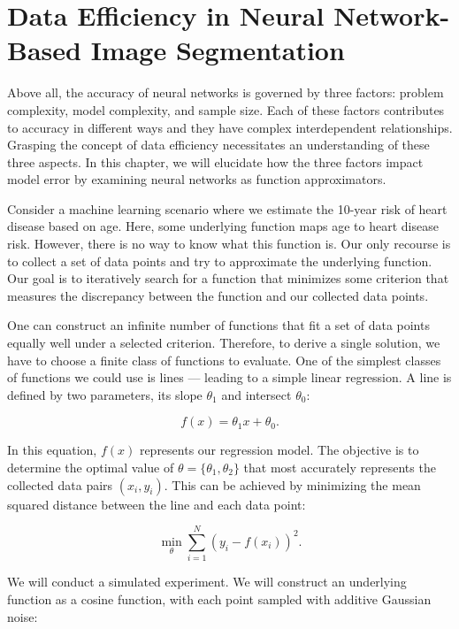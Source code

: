 
\chapter{Data Efficiency in Neural Network-Based Image Segmentation}
\label{chap:data-efficiency}

Above all, the accuracy of neural networks is governed by three factors: problem complexity, model complexity, and sample size. Each of these factors contributes to accuracy in different ways and they have complex interdependent relationships. Grasping the concept of data efficiency necessitates an understanding of these three aspects. In this chapter, we will elucidate how the three factors impact model error by examining neural networks as function approximators.

Consider a machine learning scenario where we estimate the 10-year risk of heart disease based on age. Here, some underlying function maps age to heart disease risk. However, there is no way to know what this function is. Our only recourse is to collect a set of data points and try to approximate the underlying function. Our goal is to iteratively search for a function that minimizes some criterion that measures the discrepancy between the function and our collected data points.

One can construct an infinite number of functions that fit a set of data points equally well under a selected criterion. Therefore, to derive a single solution, we have to choose a finite class of functions to evaluate. One of the simplest classes of functions we could use is lines --- leading to a simple linear regression. A line is defined by two parameters, its slope $\theta_1$ and intersect $\theta_0$:

\begin{equation}
	f(x) = \theta_1 x + \theta_0.
\end{equation}

In this equation, $f(x)$ represents our regression model. The objective is to determine the optimal value of $\theta = \{ \theta_1, \theta_2 \}$ that most accurately represents the collected data pairs $(x_i, y_i)$. This can be achieved by minimizing the mean squared distance between the line and each data point:

\begin{equation}
	\min_{\theta} \sum_{i=1}^N (y_i - f(x_i))^2.
\end{equation}

We will conduct a simulated experiment. We will construct an underlying function as a cosine function, with each point sampled with additive Gaussian noise:

